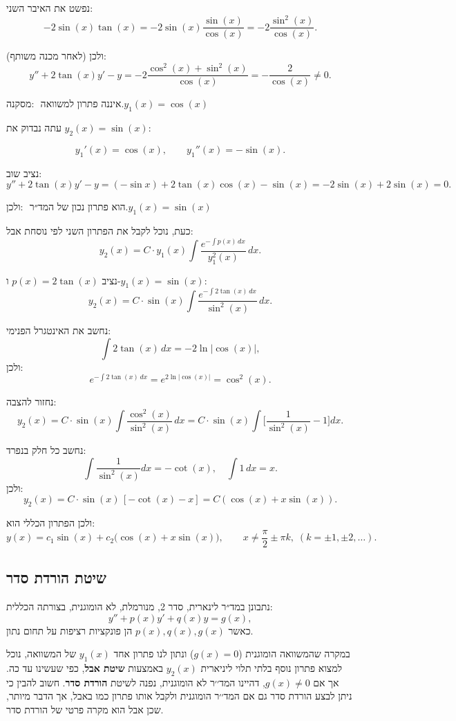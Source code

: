 \documentclass{article}
\numberwithin{equation}{section}
\begin{document}
נפשט את האיבר השני:
\[
-2\sin(x)\tan(x) = -2\sin(x)\frac{\sin(x)}{\cos(x)} = -2\frac{\sin^2(x)}{\cos(x)}.
\]

ולכן (לאחר מכנה משותף):
\[
y'' + 2\tan(x)y' - y = -2\frac{\cos^2(x) + \sin^2(x)}{\cos(x)} = -\frac{2}{\cos(x)} \neq 0.
\]

מסקנה:  
\(\text{ איננה פתרון למשוואה.}{y_1(x) = \cos(x)} 
\)

עתה נבדוק את \(y_2(x) = \sin(x)\):

\[
y_1'(x) = \cos(x), \qquad y_1''(x) = -\sin(x).
\]

נציב שוב:
\[
y'' + 2\tan(x)y' - y = (-\sin x) + 2\tan(x)\cos(x) - \sin(x)
= -2\sin(x) + 2\sin(x) = 0.
\]

ולכן:
\(\text{ הוא פתרון נכון של המד״ר.}{y_1(x) = \sin(x)} 
\)

כעת, נוכל לקבל את הפתרון השני לפי נוסחת אבל:
\[
y_2(x) = C \cdot y_1(x) \int \frac{e^{-\int p(x)\,dx}}{y_1^2(x)}\,dx.
\]

נציב \(p(x) = 2\tan(x)\) ו-\(y_1(x)=\sin(x)\):
\[
y_2(x) = C \cdot \sin(x) \int \frac{e^{-\int 2\tan(x)\,dx}}{\sin^2(x)}\,dx.
\]

נחשב את האינטגרל הפנימי:
\[
\int 2\tan(x)\,dx = -2\ln|\cos(x)|,
\]
ולכן:
\[
e^{-\int 2\tan(x)\,dx} = e^{2\ln|\cos(x)|} = \cos^2(x).
\]

נחזור להצבה:
\[
y_2(x) = C \cdot \sin(x) \int \frac{\cos^2(x)}{\sin^2(x)}\,dx 
= C \cdot \sin(x) \int \bigg[\frac{1}{\sin^2(x)} - 1\bigg] dx.
\]

נחשב כל חלק בנפרד:
\[
\int \frac{1}{\sin^2(x)}dx = -\cot(x), \quad \int 1\,dx = x.
\]
ולכן:
\[
y_2(x) = C \cdot \sin(x)\,[ -\cot(x) - x ] = C(\cos(x) + x\sin(x)).
\]

ולכן הפתרון הכללי הוא:
\[
\boxed{y(x) = c_1\sin(x) + c_2\big(\cos(x) + x\sin(x)\big)}, \qquad x \neq \frac{\pi}{2} \pm \pi k, \; (k = \pm1, \pm2, \dots).
\]

\newpage
\subsection{ שיטת הורדת סדר}

נתבונן במד״ר לינארית, סדר 2, מנורמלת, לא הומוגנית, בצורתה הכללית:
\begin{equation}
y'' + p(x)y' + q(x)y = g(x),
\end{equation}
כאשר $p(x),q(x),g(x)$ הן פונקציות רציפות על תחום נתון.

במקרה שהמשוואה הומוגנית ($g(x)=0$) ונתון לנו פתרון אחד $y_1(x)$ של המשוואה, נוכל למצוא פתרון נוסף בלתי תלוי ליניארית $y_2(x)$ באמצעות \textbf{שיטת אבל}, כפי שעשינו עד כה. אך אם $g(x)\neq0$, דהיינו המד׳׳ר לא הומוגנית, נפנה לשיטת \textbf{הורדת סדר}. חשוב להבין כי ניתן לבצע הורדת סדר גם אם המד׳׳ר הומוגנית ולקבל אותו פתרון כמו באבל, אך הדבר מיותר, שכן אבל הוא מקרה פרטי של הורדת סדר.
\end{document}
